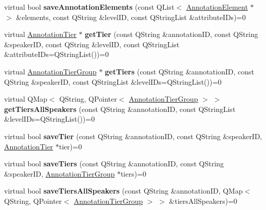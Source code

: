 \begin{DoxyCompactItemize}
virtual bool {\bfseries save\+Annotation\+Elements} (const Q\+List$<$ \hyperlink{class_annotation_element}{Annotation\+Element} $\ast$$>$ \&elements, const Q\+String \&level\+ID, const Q\+String\+List \&attribute\+I\+Ds)=0
\item 
\mbox{\label{class_annotation_datastore_a0d517fb11211e946fea7697fbce84760}} 
virtual \hyperlink{class_annotation_tier}{Annotation\+Tier} $\ast$ {\bfseries get\+Tier} (const Q\+String \&annotation\+ID, const Q\+String \&speaker\+ID, const Q\+String \&level\+ID, const Q\+String\+List \&attribute\+I\+Ds=Q\+String\+List())=0
\item 
\mbox{\label{class_annotation_datastore_af33579094950513253ac8fb8ce469cd4}} 
virtual \hyperlink{class_annotation_tier_group}{Annotation\+Tier\+Group} $\ast$ {\bfseries get\+Tiers} (const Q\+String \&annotation\+ID, const Q\+String \&speaker\+ID, const Q\+String\+List \&level\+I\+Ds=Q\+String\+List())=0
\item 
\mbox{\label{class_annotation_datastore_ac3a88f9754e4203d6d3fa69aab4a63ac}} 
virtual Q\+Map$<$ Q\+String, Q\+Pointer$<$ \hyperlink{class_annotation_tier_group}{Annotation\+Tier\+Group} $>$ $>$ {\bfseries get\+Tiers\+All\+Speakers} (const Q\+String \&annotation\+ID, const Q\+String\+List \&level\+I\+Ds=Q\+String\+List())=0
\item 
\mbox{\label{class_annotation_datastore_ac8b7d28bda28e35f8a010c0baabfa533}} 
virtual bool {\bfseries save\+Tier} (const Q\+String \&annotation\+ID, const Q\+String \&speaker\+ID, \hyperlink{class_annotation_tier}{Annotation\+Tier} $\ast$tier)=0
\item 
\mbox{\label{class_annotation_datastore_a1f58b42f870babfc061da7539b3e8230}} 
virtual bool {\bfseries save\+Tiers} (const Q\+String \&annotation\+ID, const Q\+String \&speaker\+ID, \hyperlink{class_annotation_tier_group}{Annotation\+Tier\+Group} $\ast$tiers)=0
\item 
\mbox{\label{class_annotation_datastore_a3d1f231a8356c9bea95b85e447b575c9}} 
virtual bool {\bfseries save\+Tiers\+All\+Speakers} (const Q\+String \&annotation\+ID, Q\+Map$<$ Q\+String, Q\+Pointer$<$ \hyperlink{class_annotation_tier_group}{Annotation\+Tier\+Group} $>$ $>$ \&tiers\+All\+Speakers)=0
$$
\end{DoxyCompactItemize}
